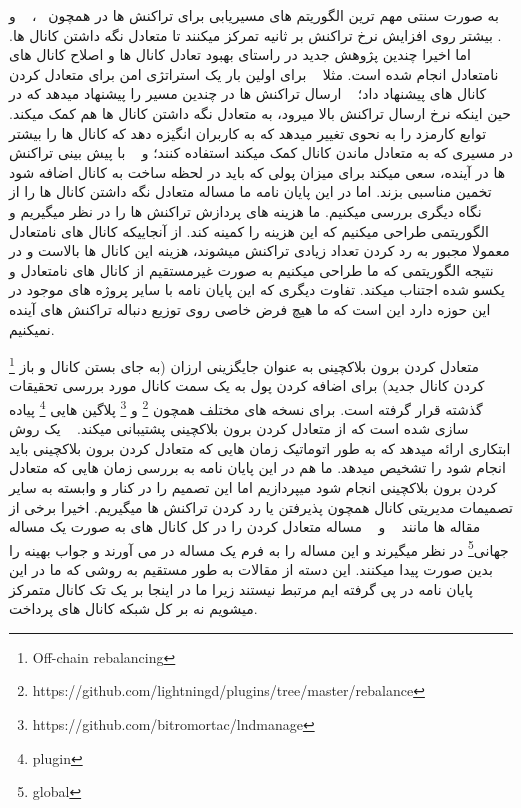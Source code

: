 
به صورت سنتی مهم ترین الگوریتم های مسیریابی برای تراکنش ها در  همچون 
~\cite{Prihodko2016FlareA}،
~\cite{MalavoltaMKM17} و
~\cite{RoosMKG18}.
بیشتر روی افزایش نرخ تراکنش بر ثانیه تمرکز میکنند تا متعادل نگه داشتن کانال ها.
اما اخیرا چندین پژوهش جدید در راستای بهبود تعادل کانال ها و اصلاح کانال های نامتعادل انجام شده است. مثلا
~\cite{KhalilG17}
برای اولین بار یک استراتژی امن برای متعادل کردن کانال های  پیشنهاد داد؛
~\cite{SivaramanVRNYMF20}
ارسال تراکنش ها در چندین مسیر را پیشنهاد میدهد که در حین اینکه نرخ ارسال تراکنش بالا میرود، به متعادل نگه داشتن کانال ها هم کمک میکند.
~\cite{Engelshoven2021TheMA}
توابع کارمزد را به نحوی تغییر میدهد که به کاربران انگیزه دهد که کانال ها را بیشتر در مسیری که به متعادل ماندن کانال کمک میکند استفاده کنند؛ و 
~\cite{LiMZ20}
با پیش بینی تراکنش ها در آینده، سعی میکند برای میزان پولی که باید در لحظه ساخت به کانال اضافه شود تخمین مناسبی بزند.
اما در این پایان نامه ما مساله متعادل نگه داشتن کانال ها را از نگاه دیگری بررسی میکنیم. ما هزینه های پردازش تراکنش ها را در نظر میگیریم و الگوریتمی طراحی میکنیم که این هزینه را کمینه کند. از آنجاییکه کانال های نامتعادل معمولا مجبور به رد کردن تعداد زیادی تراکنش میشوند، هزینه این کانال ها بالاست و در نتیجه الگوریتمی که ما طراحی میکنیم به صورت غیرمستقیم از کانال های نامتعادل و یکسو شده اجتناب میکند. تفاوت دیگری که این پایان نامه با سایر پروژه های موجود در این حوزه دارد این است که ما هیچ فرض خاصی روی توزیع دنباله تراکنش های آینده نمیکنیم.

\footnote{Off-chain rebalancing}
متعادل کردن برون بلاکچینی به عنوان جایگزینی ارزان (به جای بستن کانال و باز کردن کانال جدید) برای اضافه کردن پول به یک سمت کانال مورد بررسی تحقیقات گذشته قرار گرفته است.
برای نسخه های مختلف  همچون  
\footnote{https://github.com/lightningd/plugins/tree/master/rebalance} 
و 
\footnote{https://github.com/bitromortac/lndmanage}
 پلاگین هایی \footnote{plugin}
پیاده سازی شده است که از متعادل کردن برون بلاکچینی پشتیبانی میکند.
~\cite{PickhardtN20}
یک روش ابتکاری ارائه میدهد که به طور اتوماتیک زمان هایی که متعادل کردن برون بلاکچینی باید انجام شود را تشخیص میدهد.
ما هم در این پایان نامه به بررسی زمان هایی که متعادل کردن برون بلاکچینی انجام شود میپردازیم اما این تصمیم را در کنار و وابسته به سایر تصمیمات مدیریتی کانال همچون پذیرفتن یا رد کردن تراکنش ها میگیریم.
اخیرا برخی از مقاله ها مانند
~\cite{hidenseek} و ~\cite{KhalilG17}
مساله متعادل کردن را در کل کانال های  به صورت یک مساله جهانی\footnote{global}
در نظر میگیرند و این مساله را به فرم یک مساله
در می آورند و جواب بهینه را بدین صورت پیدا میکنند.
این دسته از مقالات به طور مستقیم به روشی که ما در این پایان نامه در پی گرفته ایم مرتبط نیستند زیرا ما در اینجا بر یک تک کانال متمرکز میشویم نه بر کل شبکه کانال های پرداخت.

